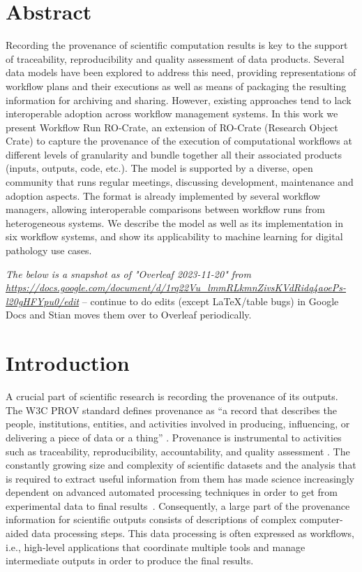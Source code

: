 \documentclass[10pt,letterpaper]{article}
\begin{document}
\section*{Abstract}
Recording the provenance of scientific computation results is key to the support of traceability, reproducibility and quality assessment of data products. 
Several data models have been explored to address this need, providing representations of workflow plans and their executions as well as means of packaging the resulting information for archiving and sharing. 
However, existing approaches tend to lack interoperable adoption across workflow management systems. 
In this work we present Workflow Run RO-Crate, an extension of RO-Crate (Research Object Crate) to capture the provenance of the execution of computational workflows at different levels of granularity and bundle together all their associated products (inputs, outputs, code, etc.). 
The model is supported by a diverse, open community that runs regular meetings, discussing development, maintenance and adoption aspects. 
The format is already implemented by several workflow managers, allowing interoperable comparisons between workflow runs from heterogeneous systems. 
We describe the model as well as its implementation in six workflow systems, and show its applicability to machine learning for digital pathology use cases.


\linenumbers



\emph{The below is a snapshot as of "Overleaf 2023-11-20" from
\url{https://docs.google.com/document/d/1rq22Vu_lmmRLkmnZivsKVdRidq4aoePs-l20gHFYpu0/edit}} -- continue to do edits (except LaTeX/table bugs) in Google Docs and Stian moves them over to Overleaf periodically.

\section{Introduction}\label{introduction}

A crucial part of scientific research is recording the provenance of its outputs.
The W3C PROV standard defines provenance as ``a record that describes the people, institutions, entities, and activities involved in producing, influencing, or delivering a piece of data or a thing''
\cite{Moreau 2013}.
Provenance is instrumental to activities such as traceability, reproducibility, accountability, and quality assessment
\cite{Herschel 2017}.
The constantly growing size and complexity of scientific datasets and the analysis that is required to extract useful information from them has made science increasingly dependent on advanced automated processing techniques in order to get from experimental data to final results~\cite{Himanen 2019, Gauthier 2019, Huntingford 2019}.
Consequently, a large part of the provenance information for scientific outputs consists of descriptions of complex computer-aided data processing steps. This data processing is often expressed as workflows, i.e., high-level applications that coordinate multiple tools and manage intermediate outputs in order to produce the final results.
\end{document}

